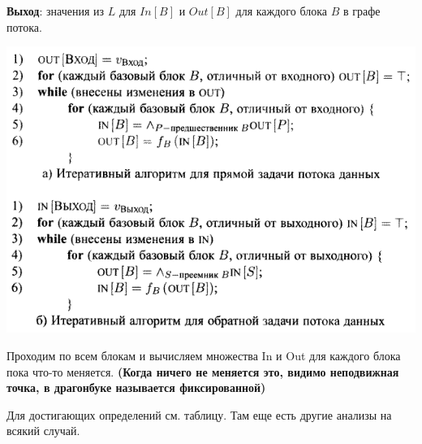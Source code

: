 \textbf{Выход}: значения из $L$ для $In[B]$ и $Out[B]$ для каждого блока $B$ в графе потока.

\includegraphics[width=0.8\columnwidth]{pics/dop26_iterative_algs.png}

Проходим по всем блокам и вычисляем множества In и Out для каждого блока пока что-то меняется. \textbf{\textbf{(Когда ничего не меняется это, видимо неподвижная точка, в драгонбуке называется фиксированной)}}

Для достигающих определений см. таблицу. Там еще есть другие анализы на всякий случай.


